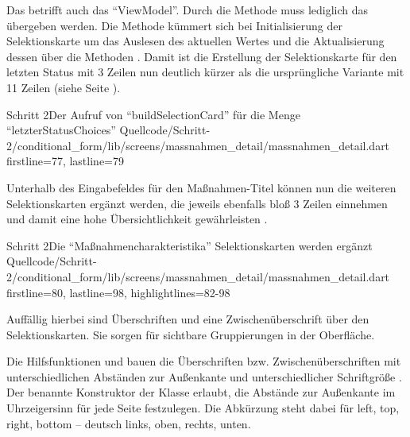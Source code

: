 Das betrifft auch das \enquote{ViewModel}. Durch die Methode  muss lediglich das  übergeben werden. Die Methode kümmert sich bei Initialisierung der Selektionskarte um das Auslesen des aktuellen Wertes  und die Aktualisierung dessen über die Methoden     . Damit ist die Erstellung der Selektionskarte für den letzten Status mit 3 Zeilen \Lst{\ref{lst:Schritt2BuildSelectionCardLetzterStatusChoices}} nun deutlich kürzer als die ursprüngliche Variante mit 11 Zeilen (siehe Seite \pageref{lst:Schritt1AusgabeDerFormularfelder}).

\begin{alexlisting}{Schritt 2}{Der Aufruf von \enquote{buildSelectionCard} für die Menge \enquote{letzterStatusChoices}}
  {Quellcode/Schritt-2/conditional_form/lib/screens/massnahmen_detail/massnahmen_detail.dart}
  {firstline=77, lastline=79}
  \label{lst:Schritt2BuildSelectionCardLetzterStatusChoices}
\end{alexlisting}

Unterhalb des Eingabefeldes für den Maßnahmen-Titel können nun die weiteren Selektionskarten ergänzt werden, die jeweils ebenfalls bloß 3 Zeilen einnehmen und damit eine hohe Übersichtlichkeit gewährleisten .

\begin{alexlisting}{Schritt 2}{Die \enquote{Maßnahmencharakteristika} Selektionskarten werden ergänzt}
  {Quellcode/Schritt-2/conditional_form/lib/screens/massnahmen_detail/massnahmen_detail.dart}
  {firstline=80, lastline=98, highlightlines={82-98}}
  \label{lst:Schritt2MassnahmencharakteristikaSelektionskartenWerdenErgaenzt}
\end{alexlisting}

Auffällig hierbei sind Überschriften  und eine Zwischenüberschrift  über den Selektionskarten. Sie sorgen für sichtbare Gruppierungen in der Oberfläche.

Die Hilfsfunktionen  und  bauen die Überschriften  bzw. Zwischenüberschriften  mit unterschiedlichen Abständen zur Außenkante  und unterschiedlicher Schriftgröße . Der benannte Konstruktor  der Klasse  erlaubt, die Abstände zur Außenkante im Uhrzeigersinn für jede Seite festzulegen. Die Abkürzung  steht dabei für left, top, right, bottom -- deutsch links, oben, rechts, unten.

